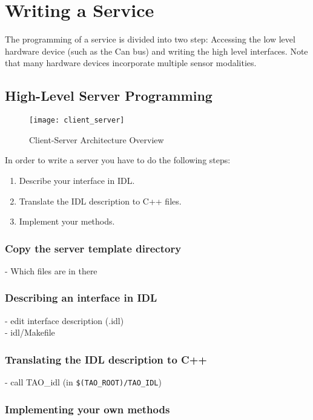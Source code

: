 \chapter{Writing a \miro Service}

The programming of a \miro service is divided into two step:
Accessing the low level hardware device (such as the Can bus) and
writing the high level interfaces. Note that many hardware devices
incorporate multiple sensor modalities.


\section{High-Level Server Programming}

\begin{figure}[!ht]
  \texttt{[image: client\_server]}
  \caption{Client-Server Architecture Overview}
  \label{FIG_CLIENT_SERVER_ARCHITECTURE}
\end{figure}

In order to write a server you have to do the following steps:
\begin{enumerate}
  \item Describe your interface in IDL.
  \item Translate the IDL description to C++ files.
  \item Implement your methods.
\end{enumerate}


\subsection{Copy the \miro server template directory}

- Which files are in there


\subsection{Describing an interface in IDL}

- edit interface description (.idl) \\
- idl/Makefile 

\subsection{Translating the IDL description to C++}

- call TAO\_idl (in {\tt \$(TAO\_ROOT)/TAO\_IDL})

\subsection{Implementing your own methods}

